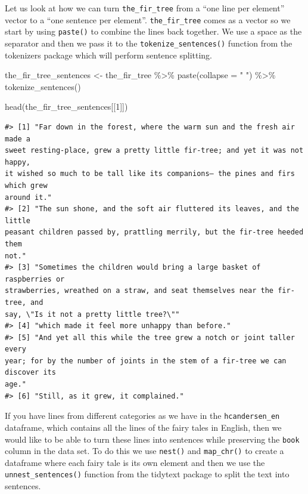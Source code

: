 \documentclass[
]{krantz}
\makeatletter
\newenvironment{Shaded}{\begin{snugshade}}{\end{snugshade}}
\newcommand{\AttributeTok}[1]{\textcolor[rgb]{0.77,0.63,0.00}{#1}}
\newcommand{\DecValTok}[1]{\textcolor[rgb]{0.00,0.00,0.81}{#1}}
\newcommand{\FunctionTok}[1]{\textcolor[rgb]{0.00,0.00,0.00}{#1}}
\newcommand{\NormalTok}[1]{#1}
\newcommand{\OtherTok}[1]{\textcolor[rgb]{0.56,0.35,0.01}{#1}}
\newcommand{\SpecialCharTok}[1]{\textcolor[rgb]{0.00,0.00,0.00}{#1}}
\newcommand{\StringTok}[1]{\textcolor[rgb]{0.31,0.60,0.02}{#1}}
\newenvironment{kframe}{%
\medskip{}
\setlength{\fboxsep}{.8em}
 \def\at@end@of@kframe{}%
 \ifinner\ifhmode%
  \def\at@end@of@kframe{\end{minipage}}%
  \begin{minipage}{\columnwidth}%
 \fi\fi%
 \def\FrameCommand##1{\hskip\@totalleftmargin \hskip-\fboxsep
 \colorbox{shadecolor}{##1}\hskip-\fboxsep
     \hskip-\linewidth \hskip-\@totalleftmargin \hskip\columnwidth}%
 \MakeFramed {\advance\hsize-\width
   \@totalleftmargin\z@ \linewidth\hsize
   \@setminipage}}%
 {\par\unskip\endMakeFramed%
 \at@end@of@kframe}
\renewenvironment{Shaded}{\begin{kframe}}{\end{kframe}}
\makeatother
\begin{document}
Let us look at how we can turn \texttt{the\_fir\_tree} from a ``one line per element'' vector to a ``one sentence per element''. \texttt{the\_fir\_tree} comes as a vector so we start by using \texttt{paste()} to combine the lines back together. We use a space as the separator and then we pass it to the \texttt{tokenize\_sentences()} function from the tokenizers package which will perform sentence splitting.

\begin{Shaded}
\begin{Highlighting}[]
\NormalTok{the\_fir\_tree\_sentences }\OtherTok{\textless{}{-}}\NormalTok{ the\_fir\_tree }\SpecialCharTok{\%\textgreater{}\%}
  \FunctionTok{paste}\NormalTok{(}\AttributeTok{collapse =} \StringTok{" "}\NormalTok{) }\SpecialCharTok{\%\textgreater{}\%}
  \FunctionTok{tokenize\_sentences}\NormalTok{()}


\FunctionTok{head}\NormalTok{(the\_fir\_tree\_sentences[[}\DecValTok{1}\NormalTok{]])}
\end{Highlighting}
\end{Shaded}

\begin{verbatim}
#> [1] "Far down in the forest, where the warm sun and the fresh air made a
sweet resting-place, grew a pretty little fir-tree; and yet it was not happy,
it wished so much to be tall like its companions– the pines and firs which grew
around it."
#> [2] "The sun shone, and the soft air fluttered its leaves, and the little
peasant children passed by, prattling merrily, but the fir-tree heeded them
not."
#> [3] "Sometimes the children would bring a large basket of raspberries or
strawberries, wreathed on a straw, and seat themselves near the fir-tree, and
say, \"Is it not a pretty little tree?\""
#> [4] "which made it feel more unhappy than before."
#> [5] "And yet all this while the tree grew a notch or joint taller every
year; for by the number of joints in the stem of a fir-tree we can discover its
age."
#> [6] "Still, as it grew, it complained."
\end{verbatim}

If you have lines from different categories as we have in the \texttt{hcandersen\_en} dataframe, which contains all the lines of the fairy tales in English, then we would like to be able to turn these lines into sentences while preserving the \texttt{book} column in the data set.
To do this we use \texttt{nest()} and \texttt{map\_chr()} to create a dataframe where each fairy tale is its own element and then we use the \texttt{unnest\_sentences()} function from the tidytext package to split the text into sentences.
\end{document}

